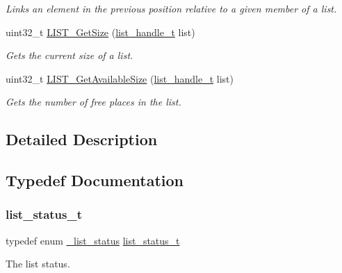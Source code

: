 \begin{DoxyCompactItemize}
\begin{DoxyCompactList}\small\item\em Links an element in the previous position relative to a given member of a list. \end{DoxyCompactList}\item 
uint32\+\_\+t \mbox{\hyperlink{group___generic_list_ga1125ff8a5fe9b3ef81cccad538dae9c7}{L\+I\+S\+T\+\_\+\+Get\+Size}} (\mbox{\hyperlink{structlist__label}{list\+\_\+handle\+\_\+t}} list)
\begin{DoxyCompactList}\small\item\em Gets the current size of a list. \end{DoxyCompactList}\item 
uint32\+\_\+t \mbox{\hyperlink{group___generic_list_ga4200c963f6db8ab4b91c11fb56bc99e2}{L\+I\+S\+T\+\_\+\+Get\+Available\+Size}} (\mbox{\hyperlink{structlist__label}{list\+\_\+handle\+\_\+t}} list)
\begin{DoxyCompactList}\small\item\em Gets the number of free places in the list. \end{DoxyCompactList}\end{DoxyCompactItemize}


\subsection{Detailed Description}


\subsection{Typedef Documentation}
\mbox{\label{group___generic_list_gaae3dc4a15b24287b8c3ac8706195aa7e}} 
\subsubsection{\texorpdfstring{list\_status\_t}{list\_status\_t}}
{\footnotesize\ttfamily typedef enum \mbox{\hyperlink{group___generic_list_ga803f4a1563b84327f6c4ece67bee52ff}{\+\_\+list\+\_\+status}}  \mbox{\hyperlink{group___generic_list_gaae3dc4a15b24287b8c3ac8706195aa7e}{list\+\_\+status\+\_\+t}}}



The list status. 





